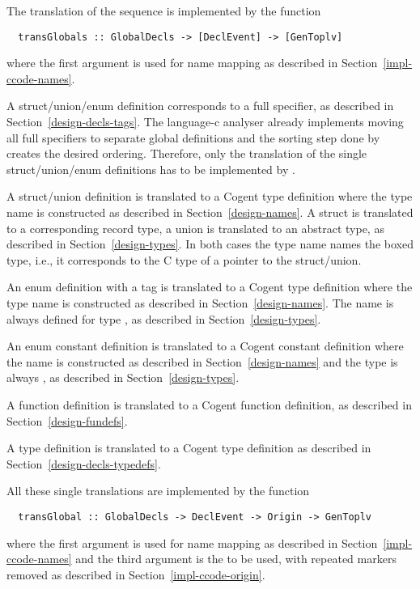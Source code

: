 The translation of the  sequence is implemented by the function
\begin{verbatim}
  transGlobals :: GlobalDecls -> [DeclEvent] -> [GenToplv]
\end{verbatim}
where the first argument is used for name mapping as described in Section~\ref{impl-ccode-names}.

A struct/union/enum definition corresponds to a full specifier, as described in Section~\ref{design-decls-tags}.
The language-c analyser already implements moving all full specifiers to separate global definitions and the
sorting step done by  creates the desired ordering. Therefore, only the translation
of the single struct/union/enum definitions has to be implemented by .

A struct/union definition is translated to a Cogent type definition where the type name is constructed as described 
in Section~\ref{design-names}. A struct is translated to a corresponding record type, a union is translated to an 
abstract type, as described in Section~\ref{design-types}.
In both cases the type name names the boxed type, i.e., it corresponds to the C type of a pointer to the struct/union.

An enum definition with a tag is translated to a Cogent type definition where the type name is constructed as described 
in Section~\ref{design-names}. The name is always defined for type , as described in Section~\ref{design-types}.

An enum constant definition is translated to a Cogent constant definition where the name is constructed as described 
in Section~\ref{design-names} and the type is always , as described in Section~\ref{design-types}.

A function definition is translated to a Cogent function definition, as described in Section~\ref{design-fundefs}.

A type definition is translated to a Cogent type definition as described in Section~\ref{design-decls-typedefs}.

All these single translations are implemented by the function
\begin{verbatim}
  transGlobal :: GlobalDecls -> DeclEvent -> Origin -> GenToplv
\end{verbatim}
where the first argument is used for name mapping as described in Section~\ref{impl-ccode-names} and the third
argument is the  to be used, with repeated markers removed as described in Section~\ref{impl-ccode-origin}.

